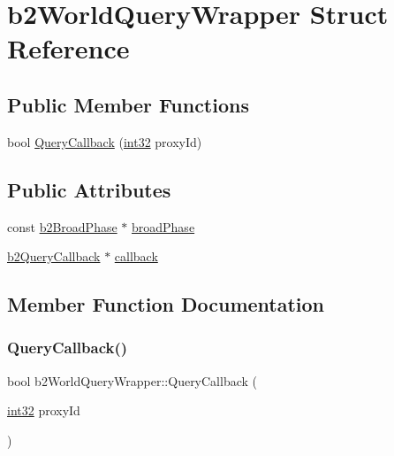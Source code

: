 \hypertarget{structb2_world_query_wrapper}{}\section{b2\+World\+Query\+Wrapper Struct Reference}
\label{structb2_world_query_wrapper}
\subsection*{Public Member Functions}
\begin{DoxyCompactItemize}
\item 
bool \mbox{\hyperlink{structb2_world_query_wrapper_a660a482e5a15b7f40a103b2dfb1711c1}{Query\+Callback}} (\mbox{\hyperlink{b2_settings_8h_a43d43196463bde49cb067f5c20ab8481}{int32}} proxy\+Id)
\end{DoxyCompactItemize}
\subsection*{Public Attributes}
\begin{DoxyCompactItemize}
\item 
const \mbox{\hyperlink{classb2_broad_phase}{b2\+Broad\+Phase}} $\ast$ \mbox{\hyperlink{structb2_world_query_wrapper_ab85c542cfaf43d2ecf31fcbfd8c0c792}{broad\+Phase}}
\item 
\mbox{\hyperlink{classb2_query_callback}{b2\+Query\+Callback}} $\ast$ \mbox{\hyperlink{structb2_world_query_wrapper_a3af9f06dfa228974fecabd2bb2b07d2e}{callback}}
\end{DoxyCompactItemize}


\subsection{Member Function Documentation}
\mbox{\label{structb2_world_query_wrapper_a660a482e5a15b7f40a103b2dfb1711c1}} 
\subsubsection{\texorpdfstring{QueryCallback()}{QueryCallback()}}
{\footnotesize\ttfamily bool b2\+World\+Query\+Wrapper\+::\+Query\+Callback (\begin{DoxyParamCaption}\item[{\mbox{\hyperlink{b2_settings_8h_a43d43196463bde49cb067f5c20ab8481}{int32}}}]{proxy\+Id }\end{DoxyParamCaption})\hspace{0.3cm}{\ttfamily [inline]}}



